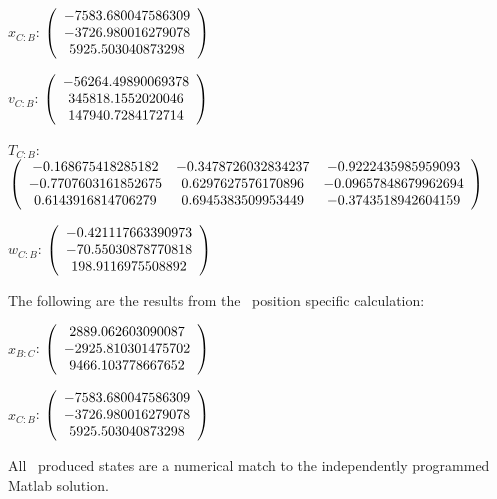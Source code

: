 \begin{description}
$x_{C:B}$: $\left( \begin{array} {ccc}  -7583.680047586309 \\    -3726.980016279078 \\     5925.503040873298
\end{array} \right)\\ \\$

$v_{C:B}$:  $\left( \begin{array} {ccc}  -56264.49890069378 \\     345818.1552020046 \\     147940.7284172714
\end{array} \right)\\ \\$

$T_{C:B}$: $\left( \begin{array} {ccc}
-0.168675418285182 &   -0.3478726032834237 &   -0.9222435985959093 \\
-0.7707603161852675 &    0.6297627576170896 &  -0.09657848679962694 \\
0.6143916814706279 &    0.6945383509953449 &   -0.3743518942604159 \\
\end{array} \right)\\ \\$

$w_{C:B}$:  $\left( \begin{array} {ccc} -0.421117663390973 \\    -70.55030878770818 \\     198.9116975508892
\end{array} \right)\\ \\$


The following are the results from the \ position specific calculation:

$x_{B:C}$: $\left( \begin{array} {ccc} 2889.062603090087 \\    -2925.810301475702 \\     9466.103778667652
\end{array} \right)\\ \\$

$x_{C:B}$: $\left( \begin{array} {ccc}  -7583.680047586309 \\    -3726.980016279078 \\     5925.503040873298
\end{array} \right)\\ \\$

All \ produced states are a numerical match to the independently programmed Matlab solution.

\end{description}

